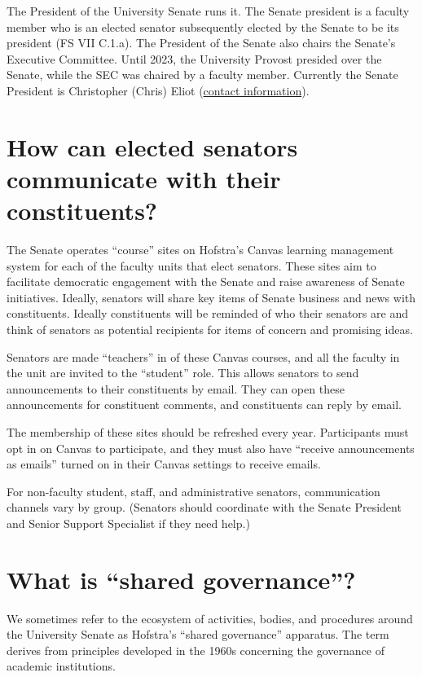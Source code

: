 \documentclass[12pt]{article}
\begin{document}
The President of the University Senate runs it. The Senate president is
a faculty member who is an elected senator subsequently elected by the
Senate to be its president (FS VII C.1.a). The President of the Senate
also chairs the Senate's Executive Committee. Until 2023, the University
Provost presided over the Senate, while the SEC was chaired by a faculty
member. Currently the Senate President is Christopher (Chris) Eliot
(\href{https://www.hofstra.edu/faculty-staff/faculty-profile.html?id=415}{contact
information}).

\section{How can elected senators communicate with their
constituents?}\label{how-can-elected-senators-communicate-with-their-constituents}

The Senate operates ``course'' sites on Hofstra's Canvas learning
management system for each of the faculty units that elect senators.
These sites aim to facilitate democratic engagement with the Senate and
raise awareness of Senate initiatives. Ideally, senators will share key
items of Senate business and news with constituents. Ideally
constituents will be reminded of who their senators are and think of
senators as potential recipients for items of concern and promising
ideas.

Senators are made ``teachers'' in of these Canvas courses, and all the
faculty in the unit are invited to the ``student'' role. This allows
senators to send announcements to their constituents by email. They can
open these announcements for constituent comments, and constituents can
reply by email.

The membership of these sites should be refreshed every year.
Participants must opt in on Canvas to participate, and they must also
have ``receive announcements as emails'' turned on in their Canvas
settings to receive emails.

For non-faculty student, staff, and administrative senators,
communication channels vary by group. (Senators should coordinate with
the Senate President and Senior Support Specialist if they need help.)

\section{What is ``shared
governance''?}\label{what-is-shared-governance}

We sometimes refer to the ecosystem of activities, bodies, and
procedures around the University Senate as Hofstra's ``shared
governance'' apparatus. The term derives from principles developed in
the 1960s concerning the governance of academic institutions.
\end{document}
